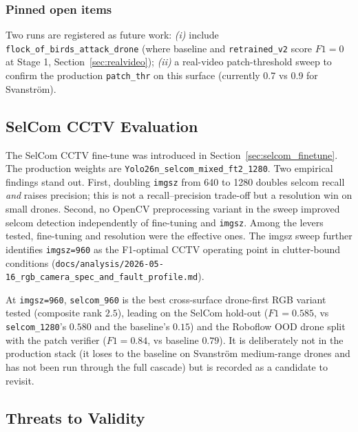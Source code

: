 \subsubsection{Pinned open items}
Two runs are registered as future work: \emph{(i)} include \texttt{flock\_of\_birds\_attack\_drone} (where baseline and \texttt{retrained\_v2} score $F1=0$ at Stage 1, Section~\ref{sec:realvideo}); \emph{(ii)} a real-video patch-threshold sweep to confirm the production \texttt{patch\_thr} on this surface (currently 0.7 vs 0.9 for Svanstr\"om).

\subsection{SelCom CCTV Evaluation}
\label{sec:selcom}

The SelCom CCTV fine-tune was introduced in Section~\ref{sec:selcom_finetune}. The production weights are \texttt{Yolo26n\_selcom\_mixed\_ft2\_1280}. Two empirical findings stand out. First, doubling \texttt{imgsz} from 640 to 1280 doubles selcom recall \emph{and} raises precision; this is not a recall--precision trade-off but a resolution win on small drones. Second, no OpenCV preprocessing variant in the sweep improved selcom detection independently of fine-tuning and \texttt{imgsz}. Among the levers tested, fine-tuning and resolution were the effective ones. The imgsz sweep further identifies \texttt{imgsz=960} as the F1-optimal CCTV operating point in clutter-bound conditions (\texttt{docs/analysis/2026-05-16\_rgb\_camera\_spec\_and\_fault\_profile.md}).

At \texttt{imgsz=960}, \texttt{selcom\_960} is the best cross-surface drone-first RGB variant tested (composite rank $2.5$), leading on the SelCom hold-out ($F1=0.585$, vs \texttt{selcom\_1280}'s $0.580$ and the baseline's $0.15$) and the Roboflow OOD drone split with the patch verifier ($F1=0.84$, vs baseline $0.79$). It is deliberately not in the production stack (it loses to the baseline on Svanstr\"om medium-range drones and has not been run through the full cascade) but is recorded as a candidate to revisit.

\subsection{Threats to Validity}
\label{sec:threats}

